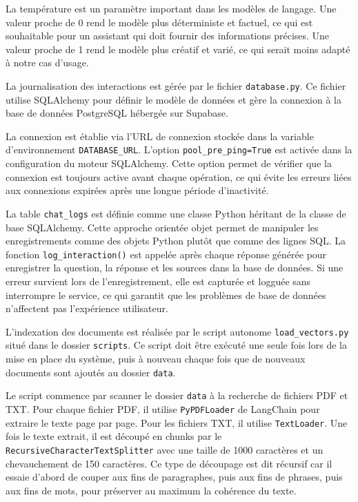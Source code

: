 \documentclass[12pt, a4paper, twoside]{report}
\begin{document}
La température est un paramètre important dans les modèles de langage. Une valeur proche de 0 rend le modèle plus déterministe et factuel, ce qui est souhaitable pour un assistant qui doit fournir des informations précises. Une valeur proche de 1 rend le modèle plus créatif et varié, ce qui serait moins adapté à notre cas d'usage.

La journalisation des interactions est gérée par le fichier \texttt{database.py}. Ce fichier utilise SQLAlchemy pour définir le modèle de données et gère la connexion à la base de données PostgreSQL hébergée sur Supabase.
\newpage

La connexion est établie via l'URL de connexion stockée dans la variable d'environnement \texttt{DATABASE\_URL}. L'option \texttt{pool\_pre\_ping=True} est activée dans la configuration du moteur SQLAlchemy. Cette option permet de vérifier que la connexion est toujours active avant chaque opération, ce qui évite les erreurs liées aux connexions expirées après une longue période d'inactivité.

La table \texttt{chat\_logs} est définie comme une classe Python héritant de la classe de base SQLAlchemy. Cette approche orientée objet permet de manipuler les enregistrements comme des objets Python plutôt que comme des lignes SQL. La fonction \texttt{log\_interaction()} est appelée après chaque réponse générée pour enregistrer la question, la réponse et les sources dans la base de données. Si une erreur survient lors de l'enregistrement, elle est capturée et logguée sans interrompre le service, ce qui garantit que les problèmes de base de données n'affectent pas l'expérience utilisateur.

L'indexation des documents est réalisée par le script autonome \texttt{load\_vectors.py} situé dans le dossier \texttt{scripts}. Ce script doit être exécuté une seule fois lors de la mise en place du système, puis à nouveau chaque fois que de nouveaux documents sont ajoutés au dossier \texttt{data}.

Le script commence par scanner le dossier \texttt{data} à la recherche de fichiers PDF et TXT. Pour chaque fichier PDF, il utilise \texttt{PyPDFLoader} de LangChain pour extraire le texte page par page. Pour les fichiers TXT, il utilise \texttt{TextLoader}. Une fois le texte extrait, il est découpé en chunks par le \texttt{RecursiveCharacterTextSplitter} avec une taille de 1000 caractères et un chevauchement de 150 caractères. Ce type de découpage est dit récursif car il essaie d'abord de couper aux fins de paragraphes, puis aux fins de phrases, puis aux fins de mots, pour préserver au maximum la cohérence du texte.
\end{document}
